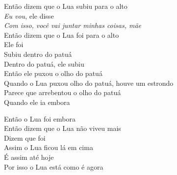 \begin{linenumbers}\begingroup\raggedright
\noindent Então dizem que o Lua subiu para o alto\\
\emph{Eu vou}, ele disse\\
\emph{Com isso, você vai juntar minhas coisas, mãe}\\
Então dizem que o Lua foi para o alto\\
Ele foi\\
Subiu dentro do patuá\\
Dentro do patuá, ele subiu\\
Então ele puxou o olho do patuá\\
Quando o Lua puxou olho do patuá, houve um estrondo\\
Parece que arrebentou o olho do patuá\\
Quando ele ia embora
\end{linenumbers}\endgroup

\bigskip

\begin{linenumbers}\begingroup\raggedright
\noindent Então o Lua foi embora\\
Então dizem que o Lua não viveu mais\\
Dizem que foi\\
Assim o Lua ficou lá em cima\\
É assim até hoje\\
Por isso o Lua está como é agora
\end{linenumbers}\endgroup

